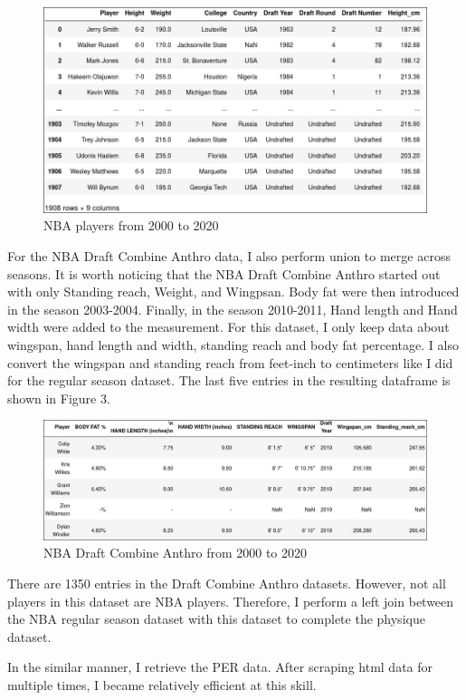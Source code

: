\documentclass[a4paper,12pt,twoside]{article}
\numberwithin{equation}{section}
\begin{document}
\begin{figure}[h]
\caption{NBA players from 2000 to 2020}
\includegraphics[scale=0.4]{nba_ap.jpg}
\centering
\end{figure}
For the NBA Draft Combine Anthro data, I also perform union to merge across seasons. It is worth noticing that the NBA Draft Combine Anthro started out with only Standing reach, Weight, and  Wingpsan. Body fat were then introduced in the season 2003-2004. Finally, in the season 2010-2011, Hand length and Hand width were added to the measurement. For this dataset, I only keep data about wingspan, hand length and width, standing reach and body fat percentage. I also convert the wingspan and standing reach from feet-inch to centimeters like I did for the regular season dataset. The last five entries in the resulting dataframe is shown in Figure 3.
\begin{figure}[!]
\caption{NBA Draft Combine Anthro from 2000 to 2020}
\includegraphics[scale=0.32]{nba_at.jpg}
\centering
\end{figure}

There are 1350 entries in the Draft Combine Anthro datasets. However, not all players in this dataset are NBA players. Therefore, I perform a left join between the NBA regular season dataset with this dataset to complete the physique dataset.

In the similar manner, I retrieve the PER data. After scraping html data for multiple times, I became relatively efficient at this skill.
\end{document}

